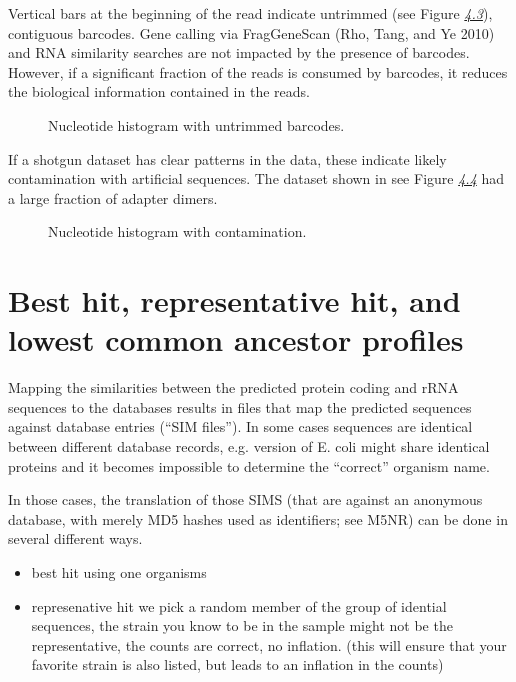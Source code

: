 \documentclass[letterpaper,10pt,english]{sphinxmanual}
\begin{document}
Vertical bars at the beginning of the read indicate untrimmed (see
Figure {\hyperref[\detokenize{user_manual:fig:nucleotide-hist-barcodes}]{\emph{4.3}}}), contiguous barcodes.
Gene calling via FragGeneScan (Rho, Tang, and Ye 2010) and RNA
similarity searches are not impacted by the presence of barcodes.
However, if a significant fraction of the reads is consumed by barcodes,
it reduces the biological information contained in the reads.

\begin{figure}[htbp]
\centering
\capstart

\noindent{}
\caption{Nucleotide histogram with untrimmed barcodes.}\label{\detokenize{user_manual:fig-nucleotide-hist-barcodes}}\end{figure}

If a shotgun dataset has clear patterns in the data, these indicate
likely contamination with artificial sequences. The dataset shown in see
Figure {\hyperref[\detokenize{user_manual:fig:nucleotide-with-contamination}]{\emph{4.4}}} had a large fraction
of adapter dimers.

\begin{figure}[htbp]
\centering
\capstart

\noindent{}
\caption{Nucleotide histogram with contamination.}\label{\detokenize{user_manual:fig-nucleotide-with-contamination}}\end{figure}


\section{Best hit, representative hit, and lowest common ancestor profiles}
\label{\detokenize{user_manual:best-hit-representative-hit-and-lowest-common-ancestor-profiles}}\label{\detokenize{user_manual:section-hit-types}}
Mapping the similarities between the predicted protein coding and rRNA
sequences to the databases results in files that map the predicted
sequences against database entries (“SIM files”). In some cases
sequences are identical between different database records, e.g. version
of E. coli might share identical proteins and it becomes impossible to
determine the “correct” organism name.

In those cases, the translation of those SIMS (that are against an
anonymous database, with merely MD5 hashes used as identifiers; see
M5NR) can be done in several different ways.
\begin{itemize}
\item {} 
best hit \textendash{} using one organisms

\item {} 
represenative hit \textendash{} we pick a random member of the group of idential
sequences, the strain you know to be in the sample might not be the
representative, the counts are correct, no inflation. (this will
ensure that your favorite strain is also listed, but leads to an
inflation in the counts)

\end{itemize}
\end{document}
